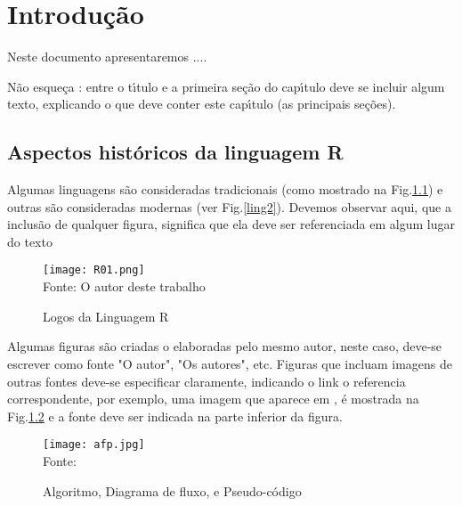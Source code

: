 


\chapter{ Introdu\c{c}\~{a}o}

Neste documento apresentaremos ....

N\~{a}o esque\c{c}a : entre o t\'{\i}tulo e a primeira se\c{c}\~{a}o do cap\'{\i}tulo deve se incluir algum texto, explicando o que deve conter este cap\'{\i}tulo (as principais se\c{c}\~{o}es).


   \section{Aspectos hist\'{o}ricos da linguagem R}



Algumas linguagens s\~{a}o consideradas  tradicionais (como mostrado na Fig.\ref{ling1}) e outras s\~{a}o consideradas modernas (ver Fig.\ref{ling2}). Devemos observar aqui, que a inclus\~{a}o de qualquer figura, significa que ela deve ser referenciada em algum lugar do texto
   \begin{figure}[H]
    \begin{center}
        \caption{Logos da Linguagem R} \label{ling1}
        \texttt{[image: R01.png]} \\
        {\tiny \sf Fonte: O autor deste trabalho }
    \end{center}
   \end{figure}

Algumas figuras s\~{a}o criadas o elaboradas pelo mesmo autor, neste caso, deve-se escrever como fonte "O autor", "Os autores", etc. Figuras que incluam imagens de outras fontes deve-se especificar claramente, indicando o link o referencia correspondente, por exemplo, uma imagem que aparece em \cite[p. 93]{Sprankle2012}, \'{e} mostrada na Fig.\ref{afp} e a fonte deve ser indicada na parte inferior da figura.
   \begin{figure}[H]
    \begin{center}
        \caption{Algoritmo, Diagrama de fluxo, e Pseudo-c\'{o}digo} \label{afp}
        \texttt{[image: afp.jpg]} \\
        {\tiny \sf Fonte: \cite[p. 93]{Sprankle2012} }
    \end{center}
   \end{figure}

